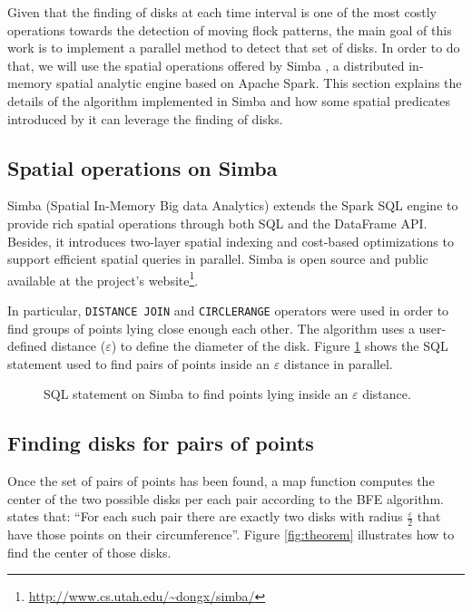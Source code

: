 \documentclass[12pt]{scrartcl}
\begin{document}
Given that the finding of disks at each time interval is one of the most costly operations towards the detection of moving flock patterns, the main goal of this work is to implement a parallel method to detect that set of disks.  In order to do that, we will use the spatial operations offered by Simba \citep{xie_simba:_2016-1}, a distributed in-memory spatial analytic engine based on Apache Spark. This section explains the details of the algorithm implemented in Simba and how some spatial predicates introduced by it can leverage the finding of disks.

\subsection{Spatial operations on Simba}
Simba (Spatial In-Memory Big data Analytics) extends the Spark SQL engine to provide rich spatial operations through both SQL and the DataFrame API.  Besides, it introduces two-layer spatial indexing and cost-based optimizations to support efficient spatial queries in parallel.  Simba is open source and public available at the project's website\footnote{\url{http://www.cs.utah.edu/~dongx/simba/}}.

In particular, \texttt{DISTANCE JOIN} and \texttt{CIRCLERANGE} operators were used in order to find groups of points lying close enough each other.  The algorithm uses a user-defined distance ($\varepsilon$) to define the diameter of the disk.  Figure \ref{fig:sql} shows the SQL statement used to find pairs of points inside an $\varepsilon$ distance in parallel.

\begin{figure}
 \centering
 \caption{SQL statement on Simba to find points lying inside an $\varepsilon$ distance.}
 \label{fig:sql}
\end{figure}

\subsection{Finding disks for pairs of points}
Once the set of pairs of points has been found, a map function computes the center of the two possible disks per each pair according to the BFE algorithm.  \cite{vieira_-line_2009} states that:  ``For each such pair there are exactly two disks with radius $\frac{\varepsilon}{2}$ that have those points on their circumference''.  Figure \ref{fig:theorem} illustrates how to find the center of those disks.
\end{document}
